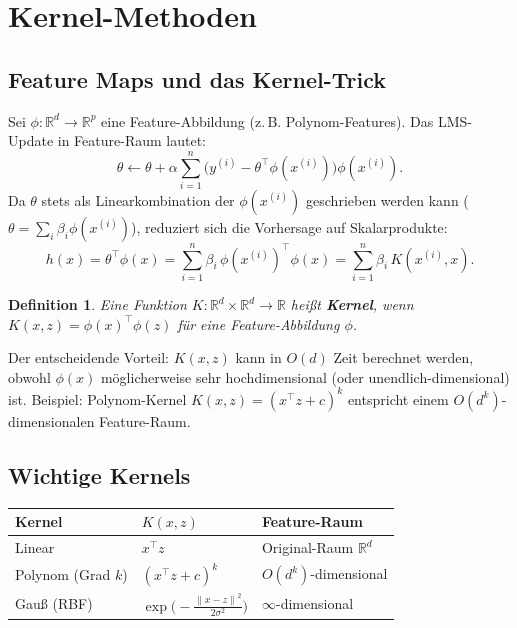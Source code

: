 \documentclass[11pt]{article}
\theoremstyle{csthm}
\theoremstyle{csdef}
\newtheorem{definition}[theorem]{Definition}
\newcommand{\R}{\mathbb{R}}
\newcommand{\norm}[1]{\left\|#1\right\|}
\newcommand{\T}{^\top}
\begin{document}
\section{Kernel-Methoden}

\subsection{Feature Maps und das Kernel-Trick}

Sei $\phi : \R^d \to \R^p$ eine Feature-Abbildung (z.\,B. Polynom-Features).
Das LMS-Update in Feature-Raum lautet:
\[
  \theta \leftarrow \theta
    + \alpha\sum_{i=1}^n \bigl(y^{(i)} - \theta\T\phi(x^{(i)})\bigr)\phi(x^{(i)}).
\]
Da $\theta$ stets als Linearkombination der $\phi(x^{(i)})$ geschrieben werden
kann ($\theta = \sum_i \beta_i \phi(x^{(i)})$), reduziert sich die Vorhersage
auf Skalarprodukte:
\begin{equation}
  h(x) = \theta\T\phi(x) = \sum_{i=1}^n \beta_i\,\phi(x^{(i)})\T\phi(x)
        = \sum_{i=1}^n \beta_i\, K(x^{(i)}, x).
\end{equation}

\begin{definition}
  Eine Funktion $K : \R^d \times \R^d \to \R$ heißt \textbf{Kernel}, wenn
  $K(x, z) = \phi(x)\T\phi(z)$ für eine Feature-Abbildung $\phi$.
\end{definition}

Der entscheidende Vorteil: $K(x,z)$ kann in $O(d)$ Zeit berechnet werden,
obwohl $\phi(x)$ möglicherweise sehr hochdimensional (oder unendlich-dimensional)
ist. Beispiel: Polynom-Kernel $K(x,z) = (x\T z + c)^k$ entspricht einem
$O(d^k)$-dimensionalen Feature-Raum.

\subsection{Wichtige Kernels}

\begin{center}
\begin{tabular}{lll}
\toprule
Kernel & $K(x, z)$ & Feature-Raum \\
\midrule
Linear & $x\T z$ & Original-Raum $\R^d$ \\
Polynom (Grad $k$) & $(x\T z + c)^k$ & $O(d^k)$-dimensional \\
Gauß (RBF) & $\exp\!\bigl(-\frac{\norm{x-z}^2}{2\sigma^2}\bigr)$ & $\infty$-dimensional \\
\bottomrule
\end{tabular}
\end{center}
\end{document}
